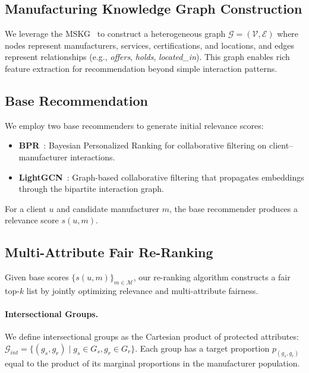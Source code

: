 \documentclass[sigconf,natbib=true]{acmart}
\begin{document}
\subsection{Manufacturing Knowledge Graph Construction}

We leverage the MSKG~\cite{li2024building} to construct a heterogeneous graph $\mathcal{G} = (\mathcal{V}, \mathcal{E})$ where nodes represent manufacturers, services, certifications, and locations, and edges represent relationships (e.g., \textit{offers}, \textit{holds}, \textit{located\_in}). This graph enables rich feature extraction for recommendation beyond simple interaction patterns.

\subsection{Base Recommendation}

We employ two base recommenders to generate initial relevance scores:
\begin{itemize}
    \item \textbf{BPR}~\cite{rendle2009bpr}: Bayesian Personalized Ranking for collaborative filtering on client--manufacturer interactions.
    \item \textbf{LightGCN}~\cite{he2020lightgcn}: Graph-based collaborative filtering that propagates embeddings through the bipartite interaction graph.
\end{itemize}

For a client $u$ and candidate manufacturer $m$, the base recommender produces a relevance score $s(u, m)$.

\subsection{Multi-Attribute Fair Re-Ranking}

Given base scores $\{s(u, m)\}_{m \in \mathcal{M}}$, our re-ranking algorithm constructs a fair top-$k$ list by jointly optimizing relevance and multi-attribute fairness.

\paragraph{Intersectional Groups.} We define intersectional groups as the Cartesian product of protected attributes: $\mathcal{G}_{int} = \{(g_s, g_r) \mid g_s \in G_s, g_r \in G_r\}$. Each group has a target proportion $p_{(g_s, g_r)}$ equal to the product of its marginal proportions in the manufacturer population.
\end{document}

